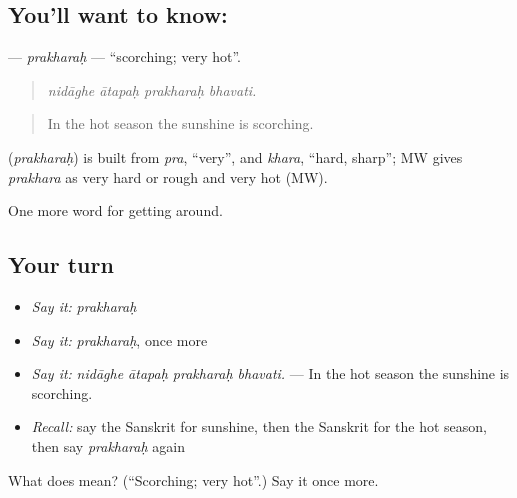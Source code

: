 \subsection*{You'll want to know: }
\textbf{} — \emph{prakharaḥ} — \textquotedblleft{}scorching; very hot\textquotedblright{}.

\begin{quote}
   
\end{quote}

\begin{quote}
\emph{nidāghe ātapaḥ prakharaḥ bhavati.}
\end{quote}

\begin{quote}
In the hot season the sunshine is scorching.
\end{quote}

\begin{cousinweb}
\textbf{} (\emph{prakharaḥ}) is built from \emph{pra}, \textquotedblleft{}very\textquotedblright{}, and \emph{khara}, \textquotedblleft{}hard, sharp\textquotedblright{}; MW gives \emph{prakhara} as very hard or rough and very hot (MW).
\end{cousinweb}

\begin{grammarlens}[title={What you've built}]
One more word for getting around.
\end{grammarlens}

\subsection*{Your turn}
\begin{itemize}
\raggedright
  \item \emph{Say it:} \emph{prakharaḥ}
  \item \emph{Say it:} \emph{prakharaḥ}, once more
  \item \emph{Say it:} \emph{nidāghe ātapaḥ prakharaḥ bhavati.} — In the hot season the sunshine is scorching.
  \item \emph{Recall:} say the Sanskrit for sunshine, then the Sanskrit for the hot season, then say \emph{prakharaḥ} again
\end{itemize}

\begin{tcolorbox}[breakable,colback=teal!4,colframe=teal!35!black,title={Before you move on}]
What does  mean? (\textquotedblleft{}Scorching; very hot\textquotedblright{}.) Say it once more.
\end{tcolorbox}
